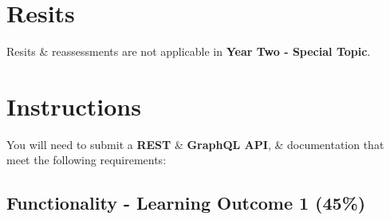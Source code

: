\documentclass{article}
\begin{document}
\section*{Resits}
Resits \& reassessments are not applicable in \textbf{Year Two - Special Topic}. 

\newpage

\section*{Instructions}
You will need to submit a \textbf{REST} \& \textbf{GraphQL API}, \& documentation that meet the following requirements:

\subsection*{Functionality - Learning Outcome 1 (45\%)}
\end{document}
